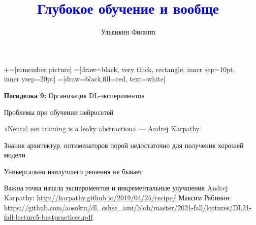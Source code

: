 \documentclass[notes,12pt, aspectratio=169]{beamer}
\title[]{\textcolor{blue}{Глубокое обучение и вообще}}
\author{Ульянкин Филипп}
\date{ }
\newenvironment{wideitemize}{\itemize\addtolength{\itemsep}{10pt}}{\enditemize}
\begin{document}
\newcommand\marktopleft[1]{%
    \tikz[overlay,remember picture] 
        \node (marker-#1-a) at (-.3em,.3em) {};%
}
\newcommand\markbottomright[2]{%
    \tikz[overlay,remember picture] 
        \node (marker-#1-b) at (0em,0em) {};%
}
+=[remember picture] 
 =[draw=black, very thick, rectangle, inner sep=10pt, inner ysep=20pt]
 =[draw=black,fill=red, text=white]


\begin{frame}
\maketitle
\centering \textbf{\color{blue} Посиделка 9:}  Организация DL-экспериментов
\end{frame}


\begin{frame}{Проблемы при обучении нейросетей}
	\begin{wideitemize}
		\item  «Neural net training is a leaky abstraction» — Andrej Karpathy
		\item  Знания архитектур, оптимизаторов порой недостаточно для получения хорошей модели
		\item Универсально наилучшего решения не бывает
		\item Важна точка начала экспериментов и инкрементальные улучшения
	\end{wideitemize}
	\vspace{1.3cm}
	\vfill
	\footnotesize
	Andrej Karpathy: {\color{blue} \url{http://karpathy.github.io/2019/04/25/recipe/} } \newline Максим Рябинин: {\color{blue}\url{https://github.com/aosokin/dl_cshse_ami/blob/master/2021-fall/lectures/DL21-fall-lecture5-bestpractices.pdf} }
\end{frame}
\end{document}

